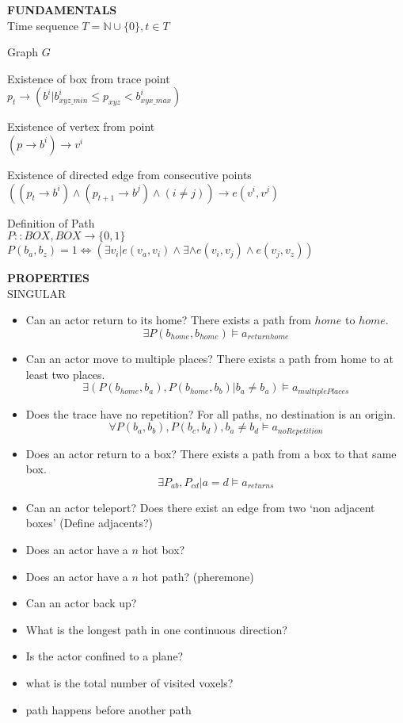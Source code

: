 \documentclass{article}
\newcommand\N{\mathbb{N}}
\begin{document}
\textbf{FUNDAMENTALS}\\
Time sequence
$T =  \N \cup \{0\}, t \in T$

Graph $G$


Existence of box from trace point\\
$p_t \rightarrow (b^i | b_{xyz\_min}^i \leq p_{xyz} < b_{xyx\_max}^i)$


Existence of vertex from point\\
$(p \rightarrow b^i) \rightarrow v^i$

Existence of directed edge from consecutive points\\
$((p_t \rightarrow b^i) \land (p_{t+1} \rightarrow b^j) \land (i \neq j)) \rightarrow e(v^i, v^j) $


Definition of Path\\
$P ::  BOX, BOX \rightarrow \{0,1\}$\\
$P(b_a, b_z) = 1 \Leftrightarrow (\exists v_i | e(v_a, v_i) \land \exists \land e(v_i, v_j) \land e(v_j, v_z)) $



\textbf{PROPERTIES}\\
SINGULAR\\
\begin{itemize}
\item Can an actor return to its home?  There exists a path from $home$ to $home$.  
  $$\exists P(b_{home}, b_{home}) \models a_{returnhome}$$ 
\item Can an actor move to multiple places? There exists a path from home to at least two places.
  $$\exists (P(b_{home}, b_a), P(b_{home}, b_b)| b_a \neq b_a) \models a_{multiplePlaces}$$

\item Does the trace have no repetition? For all paths, no destination is an origin.
  $$\forall P(b_a, b_b), P(b_c, b_d), b_a \neq b_d \models a_{noRepetition}$$

\item Does an actor return to a box? There exists a path from a box to that same box.
  $$\exists P_{ab}, P_{cd} | a = d \models a_{returns}$$
\item Can an actor teleport? Does there exist an edge from two `non adjacent boxes'  (Define adjacents?)
\item Does an actor have a $n$ hot box? 
\item Does an actor have a $n$ hot path? (pheremone)
\item Can an actor back up?
\item What is the longest path in one continuous direction?
\item Is the actor confined to a plane?
\item what is the total number of visited voxels?
\item path happens before another path
\end{itemize}
\end{document}
